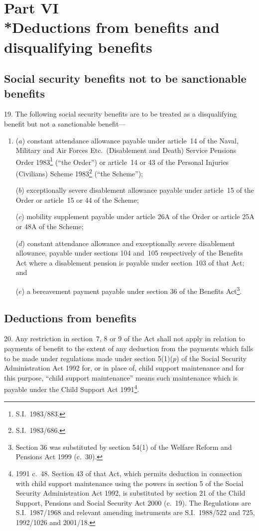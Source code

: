 \documentclass[12pt,a4paper]{article}
\begin{document}
\section[Part VI --- Deductions from benefits and disqualifying benefits]{Part VI\\*Deductions from benefits and disqualifying benefits}

\renewcommand\parthead{--- Part VI}

\subsection[19. Social security benefits not to be sanctionable benefits]{Social security benefits not to be sanctionable benefits}

19.  The following social security benefits are to be treated as a disqualifying benefit but not a sanctionable benefit—
\begin{enumerate}\item[]
($a$) constant attendance allowance payable under article~14 of the Naval, Military and Air Forces Etc.\ (Disablement and Death) Service Pensions Order 1983\footnote{S.I.~1983/883.} (“the Order”) or article~14 or 43 of the Personal Injuries (Civilians) Scheme 1983\footnote{S.I.~1983/686.} (“the Scheme”);

($b$) exceptionally severe disablement allowance payable under article~15 of the Order or article~15 or 44 of the Scheme;

($c$) mobility supplement payable under article 26A of the Order or article 25A or 48A of the Scheme;

($d$) constant attendance allowance and exceptionally severe disablement allowance, payable under sections 104 and~105 respectively of the Benefits Act where a disablement pension is payable under section~103 of that Act; and

($e$) a bereavement payment payable under section 36 of the Benefits Act\footnote{Section 36 was substituted by section 54(1) of the Welfare Reform and Pensions Act 1999 (c.~30).}.
\end{enumerate}

\subsection[20. Deductions from benefits]{Deductions from benefits}

20.  Any restriction in section~7, 8 or 9 of the Act shall not apply in relation to payments of benefit to the extent of any deduction from the payments which falls to be made under regulations made under section 5(1)($p$)  of the Social Security Administration Act 1992 for, or in place of, child support maintenance and for this purpose, “child support maintenance” means such maintenance which is payable under the Child Support Act 1991\footnote{1991 c.~48. Section 43 of that Act, which permits deduction in connection with child support maintenance using the powers in section 5 of the Social Security Administration Act 1992, is substituted by section 21 of the Child Support, Pensions and Social Security Act 2000 (c.~19). The Regulations are S.I.~1987/1968 and relevant amending instruments are S.I.~1988/522 and 725, 1992/1026 and 2001/18.}.
\end{document}

